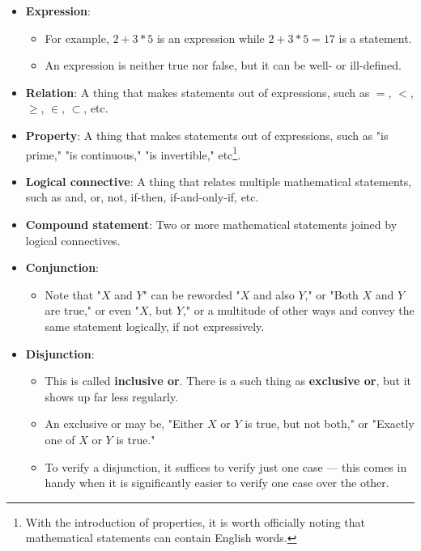 \documentclass[../main.tex]{subfiles}
\begin{document}
\begin{itemize}
    \item \textbf{Expression}: 
    \begin{itemize}
        \item For example, $2+3*5$ is an expression while $2+3*5=17$ is a statement.
        \item An expression is neither true nor false, but it can be well- or ill-defined.
    \end{itemize}
    \item \textbf{Relation}: A thing that makes statements out of expressions, such as $=$, $<$, $\geq$, $\in$, $\subset$, etc.
    \item \textbf{Property}: A thing that makes statements out of expressions, such as "is prime," "is continuous," "is invertible," etc\footnote{With the introduction of properties, it is worth officially noting that mathematical statements can contain English words.}.
    \item \textbf{Logical connective}: A thing that relates multiple mathematical statements, such as and, or, not, if-then, if-and-only-if, etc.
    \item \textbf{Compound statement}: Two or more mathematical statements joined by logical connectives.
    \item \textbf{Conjunction}: 
    \begin{itemize}
        \item Note that "$X$ and $Y$" can be reworded "$X$ and also $Y$," or "Both $X$ and $Y$ are true," or even "$X$, but $Y$," or a multitude of other ways and convey the same statement logically, if not expressively.
    \end{itemize}
    \item \textbf{Disjunction}: 
    \begin{itemize}
        \item This is called \textbf{inclusive or}. There is a such thing as \textbf{exclusive or}, but it shows up far less regularly.
        \item An exclusive or may be, "Either $X$ or $Y$ is true, but not both," or "Exactly one of $X$ or $Y$ is true."
        \item To verify a disjunction, it suffices to verify just one case --- this comes in handy when it is significantly easier to verify one case over the other.

\end{itemize}
\end{itemize}
\end{document}
